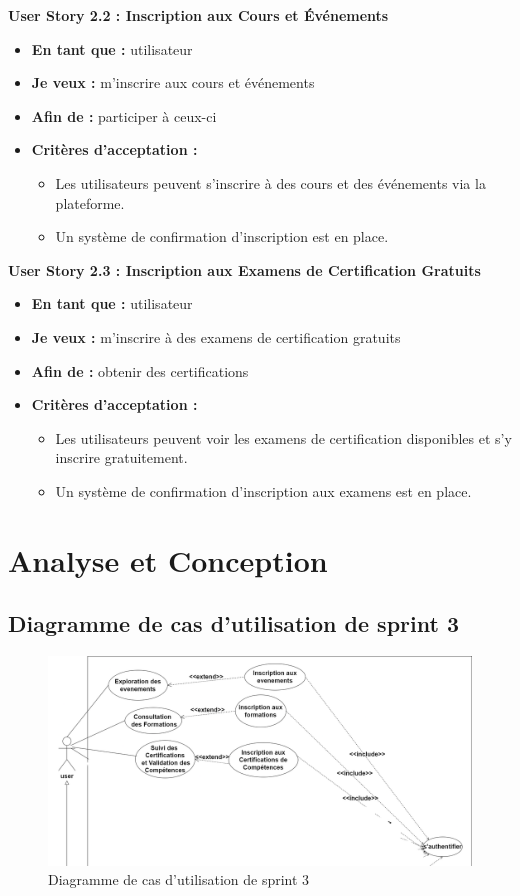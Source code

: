 \documentclass[a4paper, 11pt, openany]{report}
\begin{document}
\textbf{User Story 2.2 : Inscription aux Cours et Événements}
\begin{itemize}
    \item \textbf{En tant que :} utilisateur
    \item \textbf{Je veux :} m'inscrire aux cours et événements
    \item \textbf{Afin de :} participer à ceux-ci
    \item \textbf{Critères d'acceptation :}
    \begin{itemize}
        \item Les utilisateurs peuvent s'inscrire à des cours et des événements via la plateforme.
        \item Un système de confirmation d'inscription est en place.
    \end{itemize}
\end{itemize}

\textbf{User Story 2.3 : Inscription aux Examens de Certification Gratuits}
\begin{itemize}
    \item \textbf{En tant que :} utilisateur
    \item \textbf{Je veux :} m'inscrire à des examens de certification gratuits
    \item \textbf{Afin de :} obtenir des certifications
    \item \textbf{Critères d'acceptation :}
    \begin{itemize}
        \item Les utilisateurs peuvent voir les examens de certification disponibles et s'y inscrire gratuitement.
        \item Un système de confirmation d'inscription aux examens est en place.
    \end{itemize}
\end{itemize}


\section{Analyse et Conception}
\subsection{Diagramme de cas d'utilisation de sprint 3}

\begin{figure}[H]
\centering
\includegraphics[width=\textwidth]{sprint3-usecase.png} 
\caption{Diagramme de cas d'utilisation de sprint 3}
\label{fig:s3-use}
\end{figure}
\end{document}
